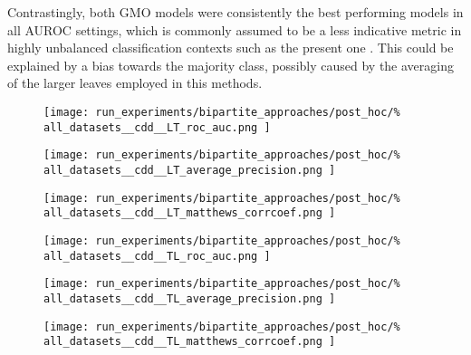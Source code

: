 \documentclass[conference]{IEEEtran}
\begin{document}
Contrastingly, both GMO models were consistently the best performing models in all AUROC settings, which is commonly assumed to be a less indicative metric in highly unbalanced classification contexts such as the present one \cite{}. This could be explained by a bias towards the majority class, possibly caused by the averaging of the larger leaves employed in this methods. %

\begin{figure*}
    \centering
    \begin{subfigure}{0.32\textwidth}
        \texttt{[image: 
            run\_experiments/bipartite\_approaches/post\_hoc/\%
            all\_datasets\_\_cdd\_\_LT\_roc\_auc.png
        ]}
    \end{subfigure}
    \begin{subfigure}{0.32\textwidth}
        \texttt{[image: 
            run\_experiments/bipartite\_approaches/post\_hoc/\%
            all\_datasets\_\_cdd\_\_LT\_average\_precision.png
        ]}
    \end{subfigure}
    \begin{subfigure}{0.32\textwidth}
        \texttt{[image: 
            run\_experiments/bipartite\_approaches/post\_hoc/\%
            all\_datasets\_\_cdd\_\_LT\_matthews\_corrcoef.png
        ]}
    \end{subfigure}

    \begin{subfigure}{0.32\textwidth}
        \texttt{[image: 
            run\_experiments/bipartite\_approaches/post\_hoc/\%
            all\_datasets\_\_cdd\_\_TL\_roc\_auc.png
        ]}
    \end{subfigure}
    \begin{subfigure}{0.32\textwidth}
        \texttt{[image: 
            run\_experiments/bipartite\_approaches/post\_hoc/\%
            all\_datasets\_\_cdd\_\_TL\_average\_precision.png
        ]}
    \end{subfigure}
    \begin{subfigure}{0.32\textwidth}
        \texttt{[image: 
            run\_experiments/bipartite\_approaches/post\_hoc/\%
            all\_datasets\_\_cdd\_\_TL\_matthews\_corrcoef.png
        ]}
    \end{subfigure}


\end{figure*}
\end{document}
